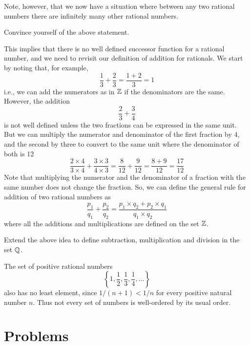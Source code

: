 Note, however, that we now have a situation where between any two rational numbers there are infinitely many other rational numbers.
\begin{exercise}
Convince yourself of the above statement.
\end{exercise}

This implies that there is no well defined successor function for a rational number, and we need to revisit our definition of addition for rationals. We start by noting that, for example,
\[
\frac{1}{3} + \frac{2}{3} = \frac{1+2}{3} = 1
\]
i.e., we can add the numerators as in $\mathbb{Z}$ if the denominators are the same. However, the addition 
\[
\frac{2}{3} + \frac{3}{4}
\]
is not well defined unless the two fractions can be expressed in the same unit. But we can multiply the numerator and denominator of the first fraction by 4, and the second by three to convert to the same unit where the denominator of both is 12
\[
\frac{2 \times 4}{3 \times 4} + \frac{3 \times 3}{4 \times 3} = \frac{8}{12} + \frac{9}{12} = \frac{8+9}{12} = \frac{17}{12}
\]
Note that multiplying the numerator and the denominator of a fraction with the same number does not change the fraction. So, we can define the general rule for addition of two rational numbers as 
\[
\frac{p_1}{q_1} + \frac{p_2}{q_2} = \frac{p_1 \times q_2 + p_2 \times q_1}{q_1 \times q_2}
\]
where all the additions and multiplications are defined on the set $\mathbb{Z}$.

\begin{exercise}
Extend the above idea to define subtraction, multiplication and division in the set $\mathbb{Q}$.
\end{exercise}

 The set
of positive rational numbers
\[
\left\{1,\frac{1}{2},\frac{1}{3},\frac{1}{4},\ldots\right\}
\]
also has no least element, since $1/(n+1)<1/n$ for every positive natural
number $n$. Thus not every set of numbers is well-ordered by its usual order.

\section*{Problems}

